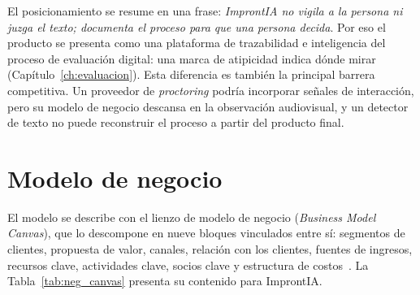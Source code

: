 El posicionamiento se resume en una frase: \textit{ImprontIA no vigila a la persona ni juzga el texto; documenta el proceso para que una persona decida}. Por eso el producto se presenta como una plataforma de trazabilidad e inteligencia del proceso de evaluación digital: una marca de atipicidad indica dónde mirar (Capítulo~\ref{ch:evaluacion}). Esta diferencia es también la principal barrera competitiva. Un proveedor de \textit{proctoring} podría incorporar señales de interacción, pero su modelo de negocio descansa en la observación audiovisual, y un detector de texto no puede reconstruir el proceso a partir del producto final.

\section{Modelo de negocio}
\label{sec:neg_canvas}

El modelo se describe con el lienzo de modelo de negocio (\textit{Business Model Canvas}), que lo descompone en nueve bloques vinculados entre sí: segmentos de clientes, propuesta de valor, canales, relación con los clientes, fuentes de ingresos, recursos clave, actividades clave, socios clave y estructura de costos~\parencite{Osterwalder2010}. La Tabla~\ref{tab:neg_canvas} presenta su contenido para ImprontIA.

